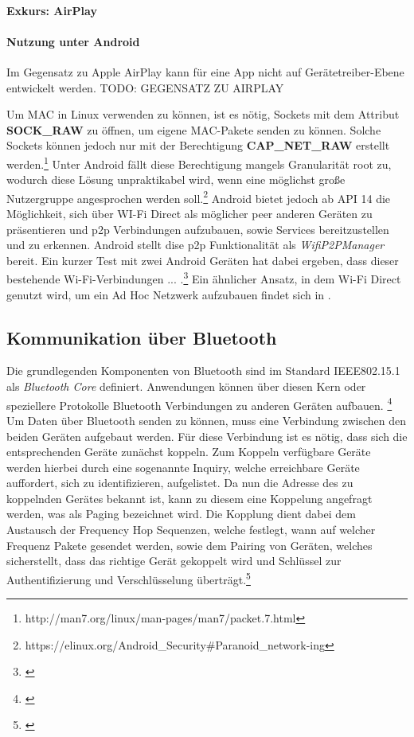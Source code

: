 \documentclass[12pt,a4paper]{article}
\begin{document}
            \paragraph{Exkurs: AirPlay}

        
            \paragraph{Nutzung unter Android}
            Im Gegensatz zu Apple AirPlay kann für eine App nicht auf Gerätetreiber-Ebene entwickelt werden. TODO: GEGENSATZ ZU AIRPLAY

            Um MAC in Linux verwenden zu können, ist es nötig, Sockets mit dem Attribut {\bf SOCK\_RAW} zu öffnen,
            um eigene MAC-Pakete senden zu können. Solche Sockets können jedoch nur mit der Berechtigung {\bf CAP\_NET\_RAW} erstellt werden.\footnote{http://man7.org/linux/man-pages/man7/packet.7.html}
            Unter Android fällt diese Berechtigung mangels Granularität root zu, wodurch diese Lösung unpraktikabel wird,
            wenn eine möglichst große Nutzergruppe angesprochen werden soll.\footnote{https://elinux.org/Android\_Security\#Paranoid\_network-ing}
            Android bietet jedoch ab API 14 die Möglichkeit, sich über WI-Fi Direct als möglicher peer anderen Geräten zu präsentieren und
            p2p Verbindungen aufzubauen, sowie Services bereitzustellen und zu erkennen.
            Android stellt dise p2p Funktionalität als {\it WifiP2PManager} bereit. Ein kurzer Test mit zwei Android Geräten hat dabei ergeben,
            dass dieser bestehende Wi-Fi-Verbindungen ... .\footnote{\cite{test-repository}}
            Ein ähnlicher Ansatz, in dem Wi-Fi Direct genutzt wird, um ein Ad Hoc Netzwerk aufzubauen findet sich in \cite{Aneja}.

        \subsection{Kommunikation über Bluetooth}
            Die grundlegenden Komponenten von Bluetooth sind im Standard IEEE802.15.1 als {\it Bluetooth Core} definiert. Anwendungen können über diesen Kern oder speziellere Protokolle Bluetooth
            Verbindungen zu anderen Geräten aufbauen. \footnote{\cite[S.228]{Lueders}} 
            Um Daten über Bluetooth senden zu können, muss eine Verbindung zwischen den beiden Geräten aufgebaut werden. Für diese Verbindung ist es nötig,
            dass sich die entsprechenden Geräte zunächst koppeln. Zum Koppeln verfügbare Geräte werden hierbei durch eine sogenannte Inquiry, welche erreichbare Geräte auffordert,
            sich zu identifizieren, aufgelistet. Da nun die Adresse des zu koppelnden Gerätes bekannt ist, kann zu diesem eine Koppelung angefragt werden, was als Paging bezeichnet wird.
            Die Kopplung dient dabei dem Austausch der Frequency Hop Sequenzen, welche festlegt, wann auf welcher Frequenz Pakete gesendet werden, sowie dem Pairing von Geräten, welches sicherstellt,
            dass das richtige Gerät gekoppelt wird und Schlüssel zur Authentifizierung und Verschlüsselung überträgt.\footnote{\cite[S.402f.]{Sauter}}
\end{document}
